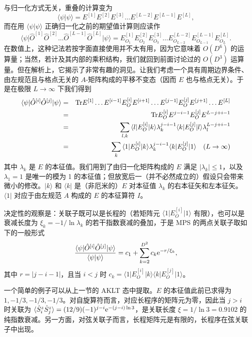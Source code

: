 \documentclass[a4paper,10pt,oneside,onecolumn,1p,times]{elsarticle}
\newcommand{\tr}{{\rm Tr }}
\newcommand{\eul}{{\rm e }}
\newcommand{\bra}[1]{\mbox{$\langle #1  |$}}
\newcommand{\ket}[1]{\mbox{$| #1  \rangle$}}
\newcommand{\braket}[2]{\mbox{$\langle #1  | #2 \rangle$}} 	%
\begin{document}
与归一化方式无关，重叠的计算变为
\begin{equation}
\braket{\psi}{\psi} = E^{[1]} E^{[2]} E^{[3]} \ldots E^{[L-2]} E^{[L-1]} E^{[L]}  ,
\end{equation}
而在用 $\braket{\psi}{\psi}$ 正确归一化之前的期望值计算则应读作
\begin{equation}
\bra{\psi} \hat{O}^{[1]} \hat{O}^{[2]} \ldots \hat{O}^{[L-1]} \hat{O}^{[L]}\ket{\psi} = E^{[1]}_{O_1} E^{[2]}_{O_2} E^{[3]}_{O_3} \ldots E^{[L-2]}_{O_{L-2}} E^{[L-1]}_{O_{L-1}} E^{[L]}_{O_L}  .
\end{equation}
在数值上，这种记法若按字面直接使用并不太有用，因为它意味着 $O(D^6)$ 的运算量；当然，若计及其内部的乘积结构，我们就回到前面讨论过的 $O(D^3)$ 运算量。但在解析上，它揭示了非常有趣的洞见。让我们考虑一个具有周期边界条件、由左规范且与格点无关的 $A$-矩阵构成的平移不变态（因而 $E$ 也与格点无关）。于是在极限 $L\rightarrow\infty$ 下我们得到
\begin{eqnarray*}
\bra{\psi} \hat{O}^{[i]}\hat{O}^{[j]} \ket{\psi} &=& \tr E^{[1]} \ldots E^{[i-1]} E^{[i]}_O E^{[i+1]} \ldots E^{[j-1]}
E^{[j]}_O E^{[j+1]} \ldots E^{[L]} \\
&=& \tr E^{[i]}_O E^{j-i-1} E^{[j]}_O E^{L-j+i-1} \\
&=& \sum_{l,k} \bra{l} E^{[i]}_O \ket{k} \lambda_k^{j-i-1} \bra{k} E^{[j]}_O \ket{l} \lambda_l^{L-j+i-1}\\
&=& \sum_k \bra{1} E^{[i]}_O \ket{k} \lambda_k^{j-i-1} \bra{k} E^{[j]}_O \ket{1} \quad (L\rightarrow\infty)
\end{eqnarray*}
其中 $\lambda_k$ 是 $E$ 的本征值。我们用到了由归一化矩阵构成的 $E$ 满足 $|\lambda_k|\leq 1$，以及 $\lambda_1=1$ 是唯一的模为 1 的本征值；但放宽后一（并不必然成立的）假设只会带来微小的修改。$\ket{k}$ 和 $\bra{k}$ 是（非厄米的）$E$ 对本征值 $\lambda_k$ 的右本征矢和左本征矢。$\bra{1}$ 对应于由左规范 $A$ 构成的 $E$ 的本征算符 $I$。

决定性的观察是：关联子既可以是长程的（若矩阵元 $ \bra{1} E^{[i]}_O \ket{1}$ 有限），也可以是衰减长度为 $\xi_k = -1/ \ln \lambda_k$ 的若干指数衰减的叠加，于是 MPS 的两点关联子取如下的一般形式
\begin{equation}
\frac{\bra{\psi} \hat{O}^{[i]} \hat{O}^{[j]} \ket{\psi}}{\braket{\psi}{\psi}} = c_1 + \sum_{k=2}^{D^2} c_k \eul^{-r/\xi_k} ,
\end{equation}
其中 $r=|j-i-1|$，且当 $i<j$ 时 $c_k = \bra{1} E^{[i]}_O \ket{k} \bra{k} E^{[j]}_O \ket{1}$。

一个简单的例子可以从上一节的 AKLT 态中提取。$E$ 的本征值此前已求得为 $1,-1/3,-1/3,-1/3$。对自旋算符而言，对应长程序的矩阵元为零，因此当 $j>i$ 时关联为 $\langle \hat{S}_i^z \hat{S}_j^z \rangle = (12/9)(-1)^{j-i} \eul^{-(j-i)\ln 3}$，是关联长度 $\xi = 1/\ln 3= 0.9102$ 的纯指数衰减。另一方面，对弦关联子而言，长程矩阵元是有限的，长程序在弦关联子中出现。
\end{document}
